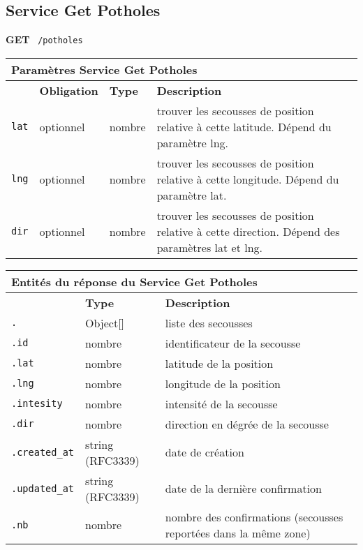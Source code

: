 \subsection{Service Get Potholes}
\label{appendix:sprint3-potholes-get-doc}

\textbf{GET} \ \texttt{/potholes}

\begin{table}[H]
    \centering
    \begin{tabularx}{\textwidth}{@{}p{2cm} p{2cm} p{3.5cm} p{6cm}@{}}
        \multicolumn{4}{X}{\textbf{Paramètres Service Get Potholes}} \\
        \toprule
        \rowcolor{gray!20}
        \multicolumn{1}{l}{\textbf{Élément}} &
        \multicolumn{1}{l}{\textbf{Obligation}} &
        \multicolumn{1}{l}{\textbf{Type}} &
        \multicolumn{1}{l}{\textbf{Description}} \\
        \midrule
        \verb|lat| & optionnel & nombre & trouver les secousses de position relative à cette latitude. Dépend du paramètre lng. \\
        \verb|lng| & optionnel & nombre & trouver les secousses de position relative à cette longitude. Dépend du paramètre lat. \\
        \verb|dir| & optionnel & nombre & trouver les secousses de position relative à cette direction. Dépend des paramètres lat et lng. \\
        \bottomrule
    \end{tabularx}
\end{table}

\begin{table}[H]
    \centering
    \begin{tabularx}{\textwidth}{@{}p{3cm} p{3.5cm} p{7.5cm}@{}}
        \multicolumn{3}{X}{\textbf{Entités du réponse du Service Get Potholes}} \\
        \toprule
        \rowcolor{gray!20}
        \multicolumn{1}{l}{\textbf{Élément}} &
        \multicolumn{1}{l}{\textbf{Type}} &
        \multicolumn{1}{l}{\textbf{Description}} \\
        \midrule
        \verb|.| & Object[] & liste des secousses \\
        \verb|.id| & nombre & identificateur de la secousse \\
        \verb|.lat| & nombre & latitude de la position \\
        \verb|.lng| & nombre & longitude de la position \\
        \verb|.intesity| & nombre & intensité de la secousse \\
        \verb|.dir| & nombre & direction en dégrée de la secousse \\
        \verb|.created_at| & string (RFC3339) & date de création \\
        \verb|.updated_at| & string (RFC3339) & date de la dernière confirmation \\
        \verb|.nb| & nombre & nombre des confirmations (secousses reportées dans la même zone) \\
        \bottomrule
    \end{tabularx}
\end{table}
